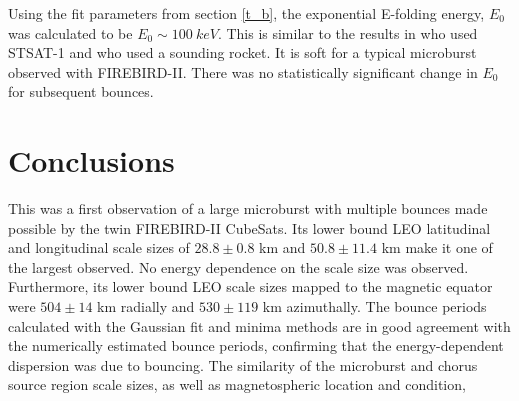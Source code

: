 \documentclass[draft, linenumbers]{agujournal}
\begin{document}
Using the fit parameters from section \ref{t_b}, the exponential E-folding energy, $E_0$ was calculated to be $E_0 \sim 100 \ keV$. This is similar to the results in \citet{Lee2005} who used STSAT-1 and \citet{Datta1997} who used a sounding rocket. It is soft for a typical microburst observed with FIREBIRD-II. There was no statistically significant change in $E_0$ for subsequent bounces.

\section{Conclusions}
This was a first observation of a large microburst with multiple bounces made possible by the twin FIREBIRD-II CubeSats. Its lower bound LEO latitudinal and longitudinal scale sizes of $28.8 \pm 0.8$ km and $ 50.8 \pm 11.4$  km make it one of the largest observed. No energy dependence on the scale size was observed. Furthermore, its lower bound LEO scale sizes mapped to the magnetic equator were  $504 \pm​ 14$ km radially and $530 \pm 119$ km azimuthally. The bounce periods calculated with the Gaussian fit and minima methods are in good agreement with the numerically estimated bounce periods, confirming that the energy-dependent dispersion was due to bouncing. The similarity of the microburst and chorus source region scale sizes, as well as magnetospheric location and condition, 




\end{document}
